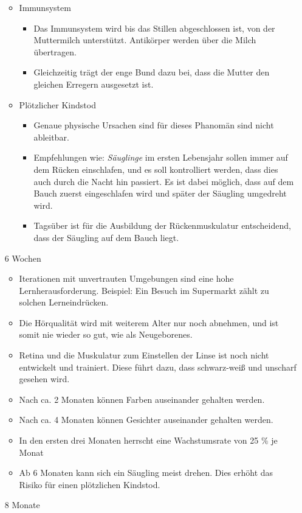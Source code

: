 \begin{enumerate}
\begin{itemize}
		\item Immunsystem
		\begin{itemize}
			\item Das Immunsystem wird bis das Stillen abgeschlossen ist, von der Muttermilch unterstützt. Antikörper werden über die Milch übertragen.
			\item Gleichzeitig trägt der enge Bund dazu bei, dass die Mutter den gleichen Erregern ausgesetzt ist.
		\end{itemize}
		\item Plötzlicher Kindstod
		\begin{itemize}
			\item Genaue physische Ursachen sind für dieses Phanomän sind nicht ableitbar.
			\item Empfehlungen wie: \textit{Säuglinge} im ersten Lebensjahr sollen immer auf dem Rücken einschlafen, und es soll kontrolliert werden, dass dies auch durch die Nacht hin passiert. Es ist dabei möglich, dass auf dem Bauch zuerst eingeschlafen wird und später der Säugling umgedreht wird. 
			\item Tagsüber ist für die Ausbildung der Rückenmuskulatur entscheidend, dass der Säugling auf dem Bauch liegt. 
		\end{itemize}
	\end{itemize}
	\item[6 Wochen]
	\begin{itemize}
		\item Iterationen mit unvertrauten Umgebungen sind eine hohe Lernherausforderung. Beispiel: Ein Besuch im Supermarkt zählt zu solchen Lerneindrücken.
		\item Die Hörqualität wird mit weiterem Alter nur noch abnehmen, und ist somit nie wieder so gut, wie als Neugeborenes.
		\item Retina und die Muskulatur zum Einstellen der Linse ist noch nicht entwickelt und trainiert. Diese führt dazu, dass schwarz-weiß und unscharf gesehen wird.
		\item Nach ca. 2 Monaten können Farben auseinander gehalten werden.
		\item Nach ca. 4 Monaten können Gesichter auseinander gehalten werden.
		\item In den ersten drei Monaten herrscht eine Wachstumsrate von 25 $\%$ je Monat
		\item Ab 6 Monaten kann sich ein Säugling meist drehen. Dies erhöht das Risiko für einen plötzlichen Kindstod.
	\end{itemize}
	\item[8 Monate]

\end{enumerate}
